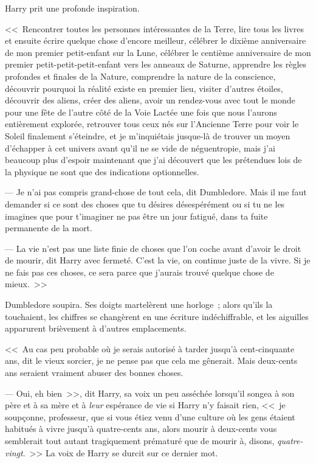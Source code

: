 Harry prit une profonde inspiration.

<<~Rencontrer toutes les personnes intéressantes de la Terre, lire tous les livres et ensuite écrire quelque chose d'encore meilleur, célébrer le dixième anniversaire de mon premier petit-enfant sur la Lune, célébrer le centième anniversaire de mon premier petit-petit-petit-enfant vers les anneaux de Saturne, apprendre les règles profondes et finales de la Nature, comprendre la nature de la conscience, découvrir pourquoi la réalité existe en premier lieu, visiter d'autres étoiles, découvrir des aliens, créer des aliens, avoir un rendez-vous avec tout le monde pour une fête de l'autre côté de la Voie Lactée une fois que nous l'aurons entièrement explorée, retrouver tous ceux nés sur l'Ancienne Terre pour voir le Soleil finalement s'éteindre, et je m'inquiétais jusque-là de trouver un moyen d'échapper à cet univers avant qu'il ne se vide de néguentropie, mais j'ai beaucoup plus d'espoir maintenant que j'ai découvert que les prétendues lois de la physique ne sont que des indications optionnelles.

--- Je n'ai pas compris grand-chose de tout cela, dit Dumbledore. Mais il me faut demander si ce sont des choses que tu désires désespérément ou si tu ne les imagines que pour t'imaginer ne pas être un jour fatigué, dans ta fuite permanente de la mort.

--- La vie n'est pas une liste finie de choses que l'on coche avant d'avoir le droit de mourir, dit Harry avec fermeté. C'est la vie, on continue juste de la vivre. Si je ne fais pas ces choses, ce sera parce que j'aurais trouvé quelque chose de mieux.~>>

Dumbledore soupira. Ses doigts martelèrent une horloge~; alors qu'ils la touchaient, les chiffres se changèrent en une écriture indéchiffrable, et les aiguilles apparurent brièvement à d'autres emplacements.

<<~Au cas peu probable où je serais autorisé à tarder jusqu'à cent-cinquante ans, dit le vieux sorcier, je ne pense pas que cela me gênerait. Mais deux-cents ans seraient vraiment abuser des bonnes choses.

--- Oui, eh bien~>>, dit Harry, sa voix un peu asséchée lorsqu'il songea à son père et à sa mère et à \emph{leur} espérance de vie si Harry n'y faisait rien, <<~je soupçonne, professeur, que si vous étiez venu d'une culture où les gens étaient habitués à vivre jusqu'à quatre-cents ans, alors mourir à deux-cents vous semblerait tout autant tragiquement prématuré que de mourir à, disons, \emph{quatre-vingt}.~>> La voix de Harry se durcit sur ce dernier mot.

